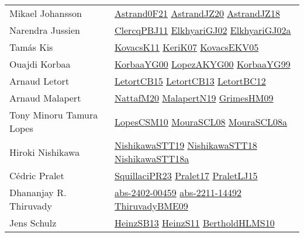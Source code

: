{\begin{longtable}{p{4cm}p{20cm}}
Mikael Johansson & \href{papers/Astrand0F21.pdf}{Astrand0F21}\cite{Astrand0F21} \href{articles/AstrandJZ20.pdf}{AstrandJZ20}\cite{AstrandJZ20} \href{papers/AstrandJZ18.pdf}{AstrandJZ18}\cite{AstrandJZ18} \\
Narendra Jussien & \href{papers/ClercqPBJ11.pdf}{ClercqPBJ11}\cite{ClercqPBJ11} \href{papers/ElkhyariGJ02.pdf}{ElkhyariGJ02}\cite{ElkhyariGJ02} \href{papers/ElkhyariGJ02a.pdf}{ElkhyariGJ02a}\cite{ElkhyariGJ02a} \\
Tam{\'{a}}s Kis & \href{articles/KovacsK11.pdf}{KovacsK11}\cite{KovacsK11} \href{papers/KeriK07.pdf}{KeriK07}\cite{KeriK07} \href{papers/KovacsEKV05.pdf}{KovacsEKV05}\cite{KovacsEKV05} \\
Ouajdi Korbaa & \href{articles/KorbaaYG00.pdf}{KorbaaYG00}\cite{KorbaaYG00} \href{articles/LopezAKYG00.pdf}{LopezAKYG00}\cite{LopezAKYG00} \href{papers/KorbaaYG99.pdf}{KorbaaYG99}\cite{KorbaaYG99} \\
Arnaud Letort & \href{articles/LetortCB15.pdf}{LetortCB15}\cite{LetortCB15} \href{papers/LetortCB13.pdf}{LetortCB13}\cite{LetortCB13} \href{papers/LetortBC12.pdf}{LetortBC12}\cite{LetortBC12} \\
Arnaud Malapert & \href{papers/NattafM20.pdf}{NattafM20}\cite{NattafM20} \href{papers/MalapertN19.pdf}{MalapertN19}\cite{MalapertN19} \href{papers/GrimesHM09.pdf}{GrimesHM09}\cite{GrimesHM09} \\
Tony Minoru Tamura Lopes & \href{articles/LopesCSM10.pdf}{LopesCSM10}\cite{LopesCSM10} \href{papers/MouraSCL08.pdf}{MouraSCL08}\cite{MouraSCL08} \href{papers/MouraSCL08a.pdf}{MouraSCL08a}\cite{MouraSCL08a} \\
Hiroki Nishikawa & \href{}{NishikawaSTT19}\cite{NishikawaSTT19} \href{papers/NishikawaSTT18.pdf}{NishikawaSTT18}\cite{NishikawaSTT18} \href{papers/NishikawaSTT18a.pdf}{NishikawaSTT18a}\cite{NishikawaSTT18a} \\
C{\'{e}}dric Pralet & \href{papers/SquillaciPR23.pdf}{SquillaciPR23}\cite{SquillaciPR23} \href{papers/Pralet17.pdf}{Pralet17}\cite{Pralet17} \href{papers/PraletLJ15.pdf}{PraletLJ15}\cite{PraletLJ15} \\
Dhananjay R. Thiruvady & \href{articles/abs-2402-00459.pdf}{abs-2402-00459}\cite{abs-2402-00459} \href{articles/abs-2211-14492.pdf}{abs-2211-14492}\cite{abs-2211-14492} \href{papers/ThiruvadyBME09.pdf}{ThiruvadyBME09}\cite{ThiruvadyBME09} \\
Jens Schulz & \href{articles/HeinzSB13.pdf}{HeinzSB13}\cite{HeinzSB13} \href{papers/HeinzS11.pdf}{HeinzS11}\cite{HeinzS11} \href{papers/BertholdHLMS10.pdf}{BertholdHLMS10}\cite{BertholdHLMS10} \\

\end{longtable}}
